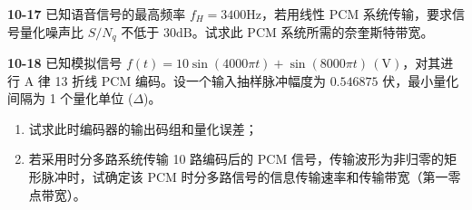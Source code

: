 \documentclass[a4paper,11pt]{ctexart}
\begin{document}
\vspace{4em}

\noindent \textbf{10-17} 已知语音信号的最高频率 $f_H=3400\text{Hz}$，若用线性 PCM 系统传输，要求信号量化噪声比 $S/N_q$ 不低于 $30\text{dB}$。试求此 PCM 系统所需的奈奎斯特带宽。

\vspace{4em}

\noindent \textbf{10-18} 已知模拟信号 $f(t) = 10\sin(4000\pi t) + \sin(8000\pi t) \, (\text{V})$，对其进行 A 律 13 折线 PCM 编码。设一个输入抽样脉冲幅度为 $0.546875$ 伏，最小量化间隔为 1 个量化单位 ($\Delta$)。
\begin{enumerate}[label=(\arabic*)]
    \item 试求此时编码器的输出码组和量化误差；
    \item 若采用时分多路系统传输 10 路编码后的 PCM 信号，传输波形为非归零的矩形脉冲时，试确定该 PCM 时分多路信号的信息传输速率和传输带宽（第一零点带宽）。
\end{enumerate}
\vspace{4em}
    
\end{document}
